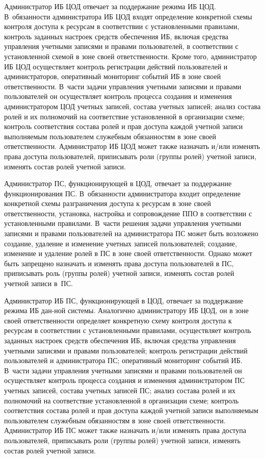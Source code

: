 \begin{multicols}{2}
       Администратор ИБ ЦОД отвечает за поддержание режима ИБ ЦОД. 
В~обязанности администратора ИБ ЦОД входят определение конкретной схемы контроля 
доступа к ресурсам в соответствии с уста\-нов\-лен\-ны\-ми правилами, контроль заданных 
настроек средств обеспечения ИБ, включая средства управления учетными записями и 
правами пользователей, в соответствии с уста\-нов\-лен\-ной схемой в зоне своей 
ответственности. Кроме того, администратор ИБ ЦОД осуществляет контроль 
регистрации действий пользователей и администраторов, оперативный мониторинг 
событий ИБ в зоне своей ответственности. В~час\-ти задачи управ\-ле\-ния учетными 
записями и правами пользователей он осуществляет контроль процесса создания и изменения 
администратором ЦОД учетных записей, состава учетных записей; анализ состава ролей и 
их полномочий на соответствие уста\-нов\-лен\-ной в организации схеме; контроль 
соответствия состава ролей и прав доступа каждой учетной записи выполняемым 
пользователем служебным обязанностям в зоне своей ответственности. 
Администратор ИБ ЦОД может также 
назначать и/или изменять права доступа пользователей, приписывать роли (группы ролей) 
учетной записи, изменять состав ролей учетной записи.
       
       Администратор ПС, функционирующей в ЦОД, отвечает за поддержание 
функционирования ПС. В~обязанности администратора входит определение конкретной 
схемы разграничения доступа к ресурсам в зоне своей ответственности, уста\-нов\-ка, 
настройка и сопровождение ППО в соответствии с уста\-нов\-лен\-ны\-ми 
правилами. В~час\-ти решения задачи управ\-ле\-ния учетными записями и правами 
пользователей на администратора ПС может быть возложено создание, удаление и 
изменение учетных записей пользователей; создание, изменение и удаление ролей в ПС в 
зоне своей ответственности. Однако может быть запрещено назначать и изменять права 
доступа пользователей в ПС, приписывать роль (группы ролей) учетной записи, изменять 
состав ролей учетной записи в~ПС.
       
       Администратор ИБ ПС, функционирующей в ЦОД, отвечает за поддержание 
режима ИБ дан-\linebreak ной сис\-те\-мы. Аналогично администратору ИБ ЦОД,
он в зоне своей 
ответственности определяет конкретную схему контроля доступа к ресурсам в 
соответствии с уста\-нов\-лен\-ны\-ми правилами, осуществляет контроль заданных настроек 
средств обеспечения ИБ, включая средства управления учетными записями и правами 
пользователей; контроль регистрации действий пользователей и администратора ПС; 
оперативный мониторинг событий ИБ. В~час\-ти задачи управ\-ле\-ния учетными 
записями и правами пользователей он осуществляет контроль процесса создания и изменения 
администратором ПС учетных записей, состава учетных записей ПС; анализ состава ролей 
и их полномочий на соответствие уста\-нов\-лен\-ной в организации схеме; контроль 
соответствия состава ролей и прав доступа каждой учетной записи выполняемым 
пользователем служебным обязанностям в зоне своей от\-вет\-ст\-вен\-ности. 
Администратор ИБ ПС может также 
назначать и/или изменять права доступа пользователей, приписывать роли (группы ролей) 
учетной записи, изменять состав ролей учетной за\-писи.
{%

}
\end{multicols}
